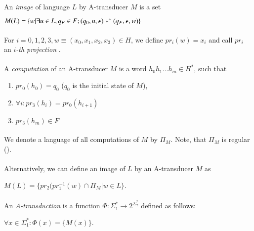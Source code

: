 \paragraph{}
 An \emph{image} of language $L$ by A-transducer $M$ is a set \\
\centerline{$M(L) = \{ w|\exists u \in L, q_{F} \in F; (q_{0}, u, \epsilon) \vdash^\ast (q_{F}, \epsilon, w) \} $}

\paragraph{}
 For $i=0,1,2,3, w \equiv (x_{0},x_{1},x_{2},x_{3}) \in H$, we define $pr_{i}(w) = x_{i}$ and call $pr_{i}$ an \emph{$i$-th projection} .

\paragraph{}
 A \emph{computation} of an A-transducer $M$ is a word $h_{0}h_{1}...h_{m} \in H^{*}$, such that
\begin{enumerate}
\item $pr_{0}(h_{0}) = q_{0}$ ($q_{0}$ is the initial state of $M$),
\item $\forall i: pr_{3}(h_{i}) = pr_{0}(h_{i+1})$
\item $pr_{3}(h_{m}) \in F$
\end{enumerate}

\paragraph{}
\oznacenie We denote a language of all computations of $M$ by $\Pi_{M}$. Note, that $\Pi_{M}$ is regular (\cite{gin:AATPFL}).

\paragraph{}
 Alternatively, we can define an image of $L$ by an A-transducer $M$ as \\
\centerline{$M(L) = \{ pr_{2}(pr_{1}^{-1}(w) \cap \Pi_{M} | w \in L \}$.}

\paragraph{}
 An \emph{A-transduction} is a function $\Phi : \Sigma_{1}^{*} \rightarrow 2^{\Sigma_{2}^{*}}$ defined as follows: \\
\centerline{$\forall x \in \Sigma_{1}^{*}: \Phi(x) = \{ M(x) \} $.}

